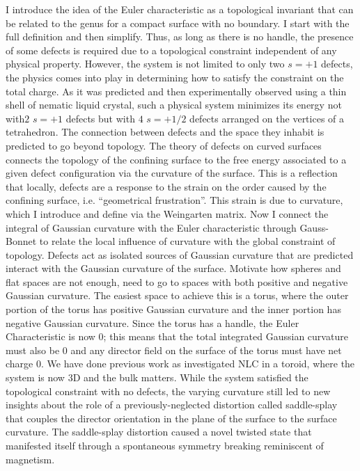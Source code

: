 I introduce the idea of the Euler characteristic as a topological invariant that can be related to the genus for a compact surface with no boundary. I start with the full definition and then simplify.
Thus, as long as there is no handle, the presence of some defects is required due to a topological constraint independent of any physical property.
However, the system is not limited to only two $s=+1$ defects, the physics comes into play in determining how to satisfy the constraint on the total charge.
As it was predicted and then experimentally observed using a thin shell of nematic liquid crystal, such a physical system minimizes its energy not with$2$ $s=+1$ defects but with $4$ $s=+1/2$ defects arranged on the vertices of a tetrahedron.
The connection between defects and the space they inhabit is predicted to go beyond topology.
The theory of defects on curved surfaces connects the topology of the confining surface to the free energy associated to a given defect configuration via the curvature of the surface.
This is a reflection that locally, defects are a response to the strain on the order caused by the confining surface, i.e. ``geometrical frustration''.
This strain is due to curvature, which I introduce and define via the Weingarten matrix.
Now I connect the integral of Gaussian curvature with the Euler characteristic through Gauss-Bonnet to relate the local influence of curvature with the global constraint of topology.
Defects act as isolated sources of Gaussian curvature that are predicted interact with the Gaussian curvature of the surface.
Motivate how spheres and flat spaces are not enough, need to go to spaces with both positive and negative Gaussian curvature.
The easiest space to achieve this is a torus, where the outer portion of the torus has positive Gaussian curvature and the inner portion has negative Gaussian curvature.
Since the torus has a handle, the Euler Characteristic is now 0; this means that the total integrated Gaussian curvature must also be 0 and any director field on the surface of the torus must have net charge 0.
We have done previous work as investigated NLC in a toroid, where the system is now 3D and the bulk matters.
While the system satisfied the topological constraint with no defects, the varying curvature still led to new insights about the role of a previously-neglected distortion called saddle-splay that couples the director orientation in the plane of the surface to the surface curvature.
The saddle-splay distortion caused a novel twisted state that manifested itself through a spontaneous symmetry breaking reminiscent of magnetism.
